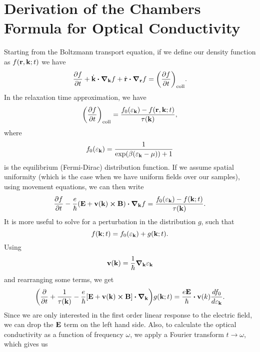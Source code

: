 \section{Derivation of the Chambers Formula for Optical Conductivity}
\label{sec:chambers}
Starting from the Boltzmann transport equation, if we define our density function as
$f(\vb{r}, \vb{k}; t)$ we have
\begin{equation}
    \pdv{f}{t} + \dot{\vb{k}}\vdot\grad_{\vb{k}}{f} + \dot{\vb{r}}\vdot\grad_{\vb{r}}{f}
    = \qty(\pdv{f}{t})_{\text{coll}}.
\end{equation}
In the relaxation time approximation, we have
\begin{equation}
    \qty(\pdv{f}{t})_{\text{coll}}
    = \frac{f_0(\varepsilon_{\vb{k}}) - f(\vb{r}, \vb{k};t)}{\tau(\vb{k})},
\end{equation}
where
\begin{equation}
    f_0(\varepsilon_{\vb{k}}) = \frac{1}{\exp(\beta(\varepsilon_{\vb{k}} - \mu)) + 1}
\end{equation}
is the equilibrium (Fermi-Dirac) distribution function. If we assume spatial uniformity
(which is the case when we have uniform fields over our samples), using movement equations,
we can then write
\begin{equation}
    \pdv{f}{t} - \frac{e}{\hbar}\qty(\vb{E} + \vb{v}(\vb{k})\cross\vb{B})\vdot\grad_{\vb{k}}{f}
    = \frac{f_0(\varepsilon_{\vb{k}}) - f(\vb{k};t)}{\tau(\vb{k})}.
\end{equation}
It is more useful to solve for a perturbation in the distribution $g$, such that
\begin{equation}
    f(\vb{k}; t) = f_0(\varepsilon_{\vb{k}}) + g(\vb{k}; t).
\end{equation}
Using
\begin{equation}
    \vb{v}(\vb{k}) = \frac{1}{\hbar}\grad_{\vb{k}}{\varepsilon_{\vb{k}}}
\end{equation}
and rearranging some terms, we get
\begin{equation}
    \qty(\pdv{t} + \frac{1}{\tau(\vb{k})}
    - \frac{e}{\hbar}[\vb{E}+\vb{v}(\vb{k})\cross\vb{B}]\vdot\grad_{\vb{k}})
    g(\vb{k}; t) = \frac{e\vb{E}}{\hbar}\vdot\vb{v}(k)\dv{f_0}{\varepsilon_{\vb{k}}}.
\end{equation}
Since we are only interested in the first order linear response to the electric field, we can
drop the $\vb{E}$ term on the left hand side. Also, to calculate the optical conductivity as
a function of frequency $\omega$, we apply a Fourier transform $t\to\omega$, which gives us
